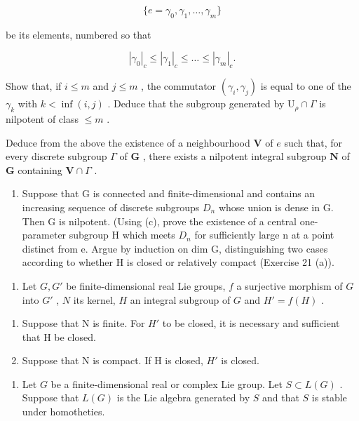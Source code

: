 \[
\{e = \gamma_ {0}, \gamma_ {1}, \dots , \gamma_ {m} \}
\]

be its elements, numbered so that

\[
\left| \gamma_ {0} \right| _ {c} \leqslant \left| \gamma_ {1} \right| _ {c} \leqslant \dots \leqslant \left| \gamma_ {m} \right| _ {c}.
\]

Show that, if \(i \leqslant m\) and \(j \leqslant m\) , the commutator \((\gamma_{i}, \gamma_{j})\) is equal to one of the \(\gamma_{k}\) with \(k < \inf(i,j)\) . Deduce that the subgroup generated by \(\mathrm{U}_{\rho} \cap \Gamma\) is nilpotent of class \(\leqslant m\) .

Deduce from the above the existence of a neighbourhood \(\mathbf{V}\) of \(e\) such that, for every discrete subgroup \(\Gamma\) of \(\mathbf{G}\) , there exists a nilpotent integral subgroup \(\mathbf{N}\) of \(\mathbf{G}\) containing \(\mathbf{V} \cap \Gamma\) .

\begin{enumerate}
\def\labelenumi{(\alph{enumi})}
\setcounter{enumi}{3}
\tightlist
\item
  Suppose that G is connected and finite-dimensional and contains an increasing sequence of discrete subgroups \(D_{n}\) whose union is dense in G. Then G is nilpotent. (Using (c), prove the existence of a central one-parameter subgroup H which meets \(D_{n}\) for sufficiently large n at a point distinct from e. Argue by induction on dim G, distinguishing two cases according to whether H is closed or relatively compact (Exercise 21 (a)).
\end{enumerate}

\begin{enumerate}
\def\labelenumi{\arabic{enumi}.}
\setcounter{enumi}{23}
\tightlist
\item
  Let \(G, G'\) be finite-dimensional real Lie groups, \(f\) a surjective morphism of \(G\) into \(G'\) , \(N\) its kernel, \(H\) an integral subgroup of \(G\) and \(H' = f(H)\) .
\end{enumerate}

\begin{enumerate}
\def\labelenumi{(\alph{enumi})}
\item
  Suppose that N is finite. For \(H'\) to be closed, it is necessary and sufficient that H be closed.
\item
  Suppose that N is compact. If H is closed, \(H'\) is closed.
\end{enumerate}

\begin{enumerate}
\def\labelenumi{\arabic{enumi}.}
\setcounter{enumi}{24}
\tightlist
\item
  Let \(G\) be a finite-dimensional real or complex Lie group. Let \(S \subset L(G)\) . Suppose that \(L(G)\) is the Lie algebra generated by \(S\) and that \(S\) is stable under homotheties.
\end{enumerate}

